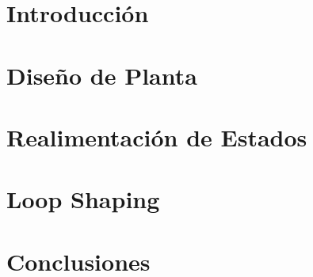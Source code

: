 




\setmainfont{AvenirLTStd-Roman}




\setmainfont{Calibri}


\MyIndex

\hypersetup{linkcolor=AzulInfo}

\newpage




\section{Introducción}


\section{Diseño de Planta}


\section{Realimentación de Estados}


\section{Loop Shaping}


\section{Conclusiones}



